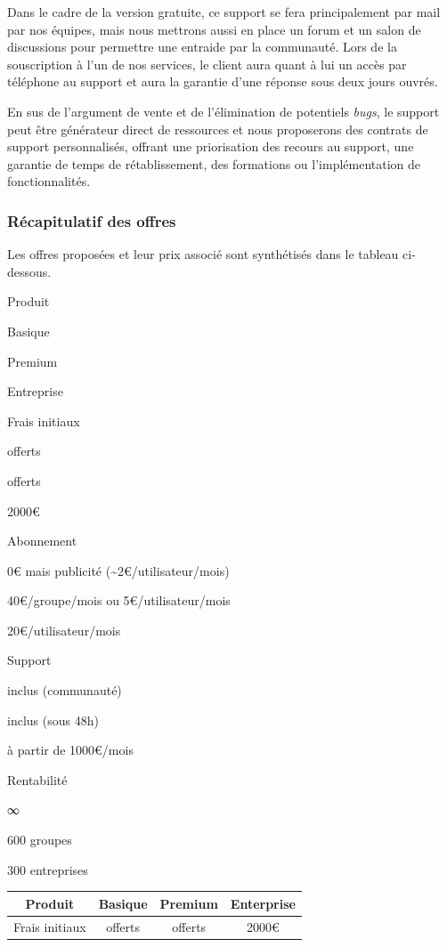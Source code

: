 \documentclass[10pt,twocolumn,a4paper,utf8x]{article}
\begin{document}
Dans le cadre de la version gratuite, ce support se fera principalement
par mail par nos équipes, mais nous mettrons aussi en place un forum et
un salon de discussions pour permettre une entraide par la communauté.
Lors de la souscription à l'un de nos services, le client aura quant à
lui un accès par téléphone au support et aura la garantie d'une réponse
sous deux jours ouvrés.

En sus de l'argument de vente et de l'élimination de potentiels
\emph{bugs}, le support peut être générateur direct de ressources et
nous proposerons des contrats de support personnalisés, offrant une
priorisation des recours au support, une garantie de temps de
rétablissement, des formations ou l'implémentation de fonctionnalités.

\subsubsection{Récapitulatif des offres}

Les offres proposées et leur prix associé sont synthétisés dans le
tableau ci-dessous.

Produit

Basique

Premium

Entreprise

Frais initiaux

offerts

offerts

2000\euro{}

Abonnement

0\euro{} mais publicité (\textasciitilde{}2\euro{}/utilisateur/mois)

40\euro{}/groupe/mois ou 5\euro{}/utilisateur/mois

20\euro{}/utilisateur/mois

Support

inclus (communauté)

inclus (sous 48h)

à partir de 1000\euro{}/mois

Rentabilité

∞

600 groupes

300 entreprises

\begin{center}
\begin{tabularx}{\hsize}{|c|c|c|c|}
  \hline
Produit & Basique & Premium & Enterprise \\
  \hline
Frais initiaux & offerts & offerts & 2000\euro \\
  \hline
\end{tabularx}
\end{center}
\end{document}

